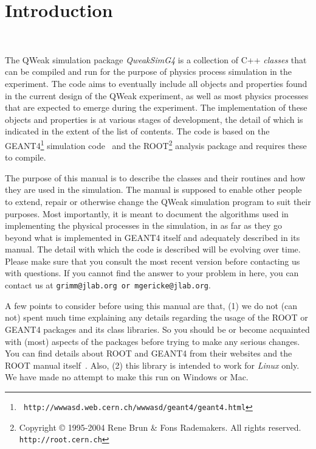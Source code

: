 \chapter{Introduction}~\label{chp:INTRO}

The QWeak simulation package {\em QweakSimG4} is a collection of C++
{\em classes} that can be compiled and run for the purpose of physics
process simulation in the experiment. The code aims to eventually
include all objects and properties found in the current design of the
QWeak experiment, as well as most physics processes that are expected
to emerge during the experiment. The implementation of these objects
and properties is at various stages of development, the detail of
which is indicated in the extent of the list of contents.  The code is
based on the GEANT4\footnote{{\tt
http://wwwasd.web.cern.ch/wwwasd/geant4/geant4.html}} simulation
code~\cite{pp:GEANT4} and the ROOT\footnote{ Copyright \copyright
1995-2004 Rene Brun \& Fons Rademakers. All rights reserved.  {\tt
http://root.cern.ch}} analysis package and requires these to compile.

The purpose of this manual is to describe the classes and their
routines and how they are used in the simulation. The manual is
supposed to enable other people to extend, repair or otherwise change
the QWeak simulation program to suit their purposes. Most importantly,
it is meant to document the algorithms used in implementing the
physical processes in the simulation, in as far as they go beyond what
is implemented in GEANT4 itself and adequately described in its
manual. The detail with which the code is described will be evolving
over time. Please make sure that you consult the most recent version
before contacting us with questions. If you cannot find the answer to
your problem in here, you can contact us at {\tt grimm@jlab.org or
mgericke@jlab.org}.

A few points to consider before using this manual are that, (1) we do
not (can not) spent much time explaining any details regarding the
usage of the ROOT or GEANT4 packages and its class libraries. So you
should be or become acquainted with (most) aspects of the packages
before trying to make any serious changes. You can find details about
ROOT and GEANT4 from their websites and the ROOT manual
itself~\cite{tn:ROOT}.  Also, (2) this library is intended to work for
{\em Linux} only. We have made no attempt to make this run on Windows
or Mac.

\clearpage

